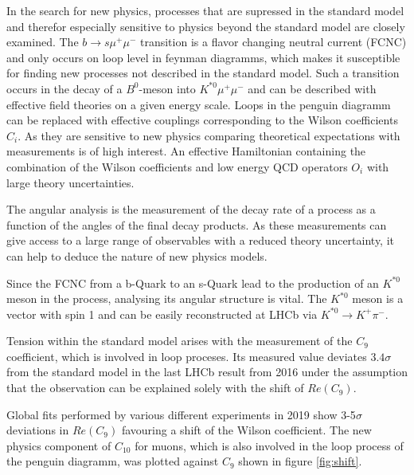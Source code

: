 \documentclass[%
 reprint,
 amsmath,amssymb,
 aps,
]{revtex4-2}
\begin{document}
In the search for new physics, processes that are supressed in the standard model and therefor especially sensitive to physics beyond the
standard model are closely examined. The $b \longrightarrow s\mu^+\mu^-$ transition is a flavor changing neutral current (FCNC) and only occurs on
loop level in feynman diagramms, which makes it susceptible for finding new processes not described in the standard model. Such a
transition occurs in the decay of a $B^0$-meson into $K^{*0}\mu^+\mu^-$ and can be described with effective field theories on a given energy scale.
Loops in the penguin diagramm can be replaced with effective couplings corresponding to the Wilson coefficients $C_i$. As they are sensitive to
new physics comparing theoretical expectations with measurements is of high interest. An effective Hamiltonian containing the
combination of the Wilson coefficients and low energy QCD operators $O_i$ with large theory uncertainties.

The angular analysis is the measurement of the decay rate of a process as a function of the angles of the final decay products. As these
measurements can give access to a large range of observables with a reduced theory uncertainty, it can help
to deduce the nature of new physics models.

Since the FCNC from a b-Quark to an s-Quark lead to the production of an $K^{*0}$ meson in the process, analysing its angular structure is
vital. The $K^{*0}$ meson is a vector with spin 1 and can be easily reconstructed at LHCb via $K^{*0} \longrightarrow K^+\pi^-$.

Tension within the standard model arises with the measurement of the $C_9$ coefficient, which is involved in loop proceses.
Its measured value deviates $3.4\sigma$ from the standard model in the last LHCb result from 2016
under the assumption that the observation can be explained solely with the shift of $Re(C_9)$.

Global fits performed by various different experiments in 2019 show 3-5$\sigma$ deviations in $Re(C_9)$ favouring a shift of the
Wilson coefficient. The new physics component of $C_{10}$ for muons, which is also involved in the loop process of the penguin diagramm, was
plotted against $C_9$ shown in figure \ref{fig:shift}.
\end{document}
